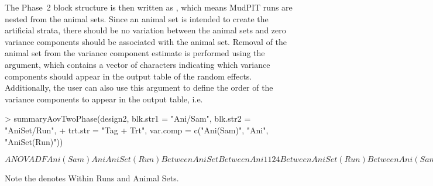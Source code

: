 \documentclass[article]{jss}
\begin{document}
The Phase~2 block structure is then written as , which means MudPIT runs are nested from the animal sets. Since an animal set is intended to create the artificial strata, there should be no variation between the animal sets and zero variance components should be associated with the animal set. Removal of the animal set from the variance component estimate is performed using the  argument, which contains a vector of characters indicating which variance components should appear in the output table of the random effects. Additionally, the user can also use this argument to define the order of the variance components to appear in the output table, i.e.
\begin{CodeChunk}
\begin{CodeInput}
> summaryAovTwoPhase(design2, blk.str1 =  "Ani/Sam", blk.str2 = "AniSet/Run", 
+ trt.str = "Tag + Trt", var.comp = c("Ani(Sam)", "Ani", "AniSet(Run)"))                                    
\end{CodeInput}
\begin{CodeOutput}
$ANOVA
                    DF Ani(Sam) Ani AniSet(Run)
Between AniSet                                 
   Between Ani      1  1        2   4          
Between AniSet(Run)                            
   Between Ani(Sam) 2  1        0   4          
Within AniSet.Run                              
   Between Ani                                 
      Tag           1  1        2   0          
      Trt           1  1        2   0          
      Residual      4  1        2   0          
   Between Ani(Sam)                            
      Tag           2  1        0   0          
      Residual      4  1        0   0       
$   
\end{CodeOutput}
\end{CodeChunk}
Note the  denotes Within Runs and Animal Sets.  
\end{document}
